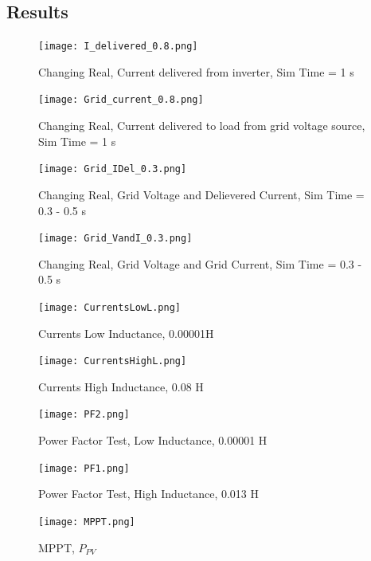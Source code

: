 \documentclass[12pt,twoside]{scrartcl}
\begin{document}
\subsection{Results}
\begin{figure}[htp]
    \centering
    \texttt{[image: I\_delivered\_0.8.png]}
    \caption{Changing Real, Current delivered from inverter, Sim Time = 1 s}
    \label{fig:deliveredcurrent}
\end{figure}
\begin{figure}[htp]
    \centering
    \texttt{[image: Grid\_current\_0.8.png]}
    \caption{Changing Real, Current delivered to load from grid voltage source, Sim Time = 1 s}
    \label{fig:gridcurrent}
\end{figure}
\begin{figure}[htp]
    \centering
    \texttt{[image: Grid\_IDel\_0.3.png]}
    \caption{Changing Real, Grid Voltage and Delievered Current, Sim Time = 0.3 - 0.5 s}
    \label{fig:gridVdelI}
\end{figure}
\begin{figure}[htp]
    \centering
    \texttt{[image: Grid\_VandI\_0.3.png]}
    \caption{Changing Real, Grid Voltage and Grid Current, Sim Time = 0.3 - 0.5 s}
    \label{fig:gridVgridI}
\end{figure}
\begin{figure}[htp]
    \centering
    \texttt{[image: CurrentsLowL.png]}
    \caption{Currents Low Inductance, 0.00001H}
    \label{fig:LowL}
\end{figure}
\begin{figure}[htp]
    \centering
    \texttt{[image: CurrentsHighL.png]}
    \caption{Currents High Inductance, 0.08 H}
    \label{fig:HighL}
\end{figure}
\begin{figure}[htp]
    \centering
    \texttt{[image: PF2.png]}
    \caption{Power Factor Test, Low Inductance, 0.00001 H}
    \label{fig:pf2}
\end{figure}
\begin{figure}[htp]
    \centering
    \texttt{[image: PF1.png]}
    \caption{Power Factor Test, High Inductance, 0.013 H}
    \label{fig:pf1}
\end{figure}
\newpage
\begin{figure}[htp]
    \centering
    \texttt{[image: MPPT.png]}
    \caption{MPPT, $P_{PV}$}
    \label{fig:MPPT}
\end{figure}
\newpage
\end{document}
